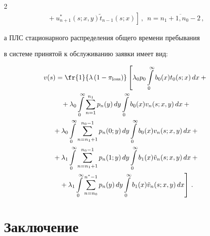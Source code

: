 \begin{multicols}{2}
\begin{multline*}
\left.{}+


u^*_{n+1}(s;x,y) \tilde{t}_{n-1}(s;x) \right] \,,


\ \ n=\overline{n_1+1,n_0-2}\,,


\end{multline*}


а ПЛС стационарного распределения общего времени пребывания


в системе принятой к обслуживанию заявки имеет вид:


\begin{multline*}


v(s)= \fr{1}{ \lambda \left(1-\pi_{\mathrm{loss}}\right)}


\left[


\lambda_0 p_0 \int\limits_0^\infty b_0(x) t_0(s;x) \, dx


+{}\right.\\


\left.{}+ \lambda_0 \int\limits_0^\infty \sum\limits_{n=1}^{n_1}


p_n(y) \, dy \int\limits_0^\infty b_0(x) v_n(s;x,y) \, dx +{}\right.


\\


{}+


\lambda_0 \int\limits_0^\infty \sum\limits_{n=n_1+1}^{n_0-1}


p_n(0;y)\, dy \int\limits_0^\infty b_0(x) v_n(s;x,y) \, dx +{}\\


{}+ \lambda_1 \int\limits_0^\infty \sum\limits_{n=n_1+1}^{n_0-1}


p_n(1;y)\, dy \int\limits_0^\infty b_1(x) \tilde{v}_n(s;x,y) \, dx+{}\\


\left.{}+ \lambda_1 \int\limits_0^\infty \sum\limits_{n=n_0}^{n^*-1} p_n(y)\, dy


\int\limits_0^\infty b_1(x) \tilde{v}_n(s;x,y)\, dx


\right]\,.


\end{multline*}





\section{Заключение}









\end{multicols}
